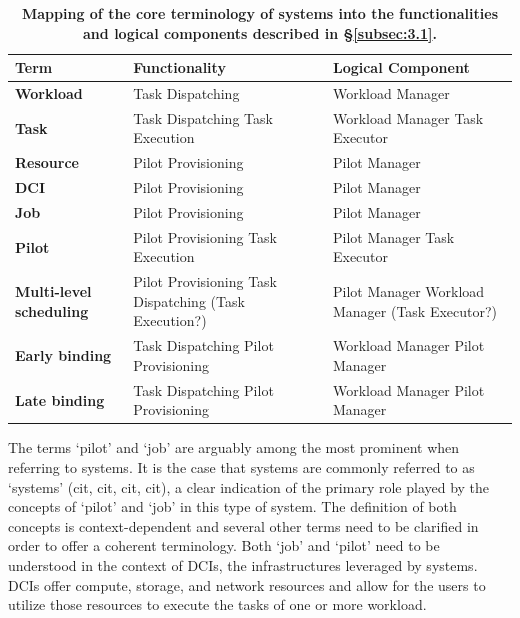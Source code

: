 \documentclass{sig-alternate}
\begin{document}
\begin{table}
 \centering
 \begin{tabular}{|p{4cm}|p{3.2cm}|p{3.2cm}|}
  \hline
    \textbf{Term} & \textbf{Functionality} & \textbf{Logical Component} \\
  \hline
  \hline
    \textbf{Workload} & Task Dispatching & Workload Manager \\
  \hline
    \textbf{Task} & Task Dispatching \newline
    Task Execution & Workload Manager \newline
    Task Executor \\
  \hline
    \textbf{Resource} & Pilot Provisioning & Pilot Manager \\
  \hline
    \textbf{DCI} & Pilot Provisioning & Pilot Manager \\
  \hline
    \textbf{Job} & Pilot Provisioning & Pilot Manager \\
  \hline
    \textbf{Pilot} & Pilot Provisioning \newline
    Task Execution & Pilot Manager \newline
    Task Executor \\
  \hline
    \textbf{Multi-level scheduling} &
    Pilot Provisioning \newline Task Dispatching \newline (Task Execution?) &
    Pilot Manager \newline Workload Manager \newline (Task Executor?) \\
  \hline
    \textbf{Early binding} & Task Dispatching \newline
    Pilot Provisioning & Workload Manager \newline
    Pilot Manager\\
  \hline
    \textbf{Late binding} & Task Dispatching \newline
    Pilot Provisioning  & Workload Manager \newline
    Pilot Manager\\
  \hline
 \end{tabular}
 \caption{\textbf{Mapping of the core terminology of \pilot systems into
  the functionalities and logical components described in
  \S\ref{subsec:3.1}.}}
 \label{table:terminology}
\end{table}

The terms `pilot' and `job' are arguably among the most prominent when
referring to \pilot systems. It is the case that \pilot systems are
commonly referred to as `\pilotjob systems' (cit, cit, cit, cit), a
clear indication of the primary role played by the concepts of `pilot'
and `job' in this type of system. The definition of both concepts is
context-dependent and several other terms need to be clarified in order
to offer a coherent terminology. Both `job' and `pilot' need to be
understood in the context of DCIs, the infrastructures leveraged by
\pilot systems. DCIs offer compute, storage, and network resources and
\pilot allow for the users to utilize those resources to execute the
tasks of one or more workload.
\end{document}
